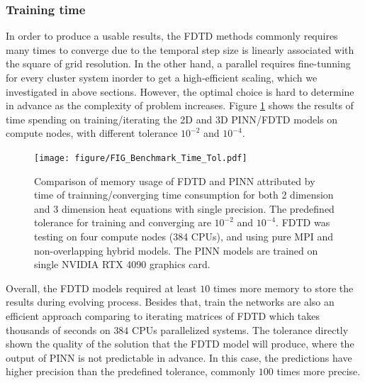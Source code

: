 \subsubsection{Training time}
In order to produce a usable results, the FDTD methods commonly requires many times to converge due to the 
temporal step size is linearly associated with the square of grid resolution.
In the other hand, a parallel requires fine-tunning for every cluster system inorder to get a high-efficient scaling, which we 
investigated in above sections.
However, the optimal choice is hard to determine in advance as the complexity of problem increases.
Figure \ref{FIG:Benchmark:TimeTol} shows the results of 
time spending on training/iterating the 2D and 3D PINN/FDTD models on compute nodes, with different tolerance $10^{-2}$ and $10^{-4}$.
\begin{figure}[htbp]
  \centering
  \texttt{[image: figure/FIG\_Benchmark\_Time\_Tol.pdf]}
  \caption{
    Comparison of memory usage of FDTD and PINN attributed by time of trainning/converging time consumption for 
    both 2 dimension and 3 dimension heat equations with single precision. 
    The predefined tolerance for training and converging are $10^{-2}$ and $10^{-4}$.
    FDTD was testing on four compute nodes (384 CPUs), and using pure MPI and non-overlapping hybrid models.
    The PINN models are trained on single NVIDIA RTX 4090 graphics card.
  }
  \label{FIG:Benchmark:TimeTol}
\end{figure}

Overall, the FDTD models required at least $10$ times more memory to store the results during evolving process.
Besides that, train the networks are also an efficient approach comparing to iterating matrices of FDTD
which takes thousands of seconds on $384$ CPUs parallelized systems.
The tolerance directly shown the quality of the solution that the FDTD model will produce, 
where the output of PINN is not predictable in advance.
In this case, the predictions have higher precision than the predefined tolerance, commonly $100$ times 
more precise.








